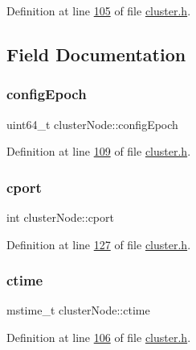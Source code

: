 Definition at line \hyperlink{cluster_8h_source_l00105}{105} of file \hyperlink{cluster_8h_source}{cluster.\+h}.



\subsection{Field Documentation}
\mbox{\label{structclusterNode_aa72bc6455e36e662bc5a53fc427452a5}} 
\subsubsection{\texorpdfstring{config\+Epoch}{configEpoch}}
{\footnotesize\ttfamily uint64\+\_\+t cluster\+Node\+::config\+Epoch}



Definition at line \hyperlink{cluster_8h_source_l00109}{109} of file \hyperlink{cluster_8h_source}{cluster.\+h}.

\mbox{\label{structclusterNode_afd795cbf257e028b15baa5338ebf10e8}} 
\subsubsection{\texorpdfstring{cport}{cport}}
{\footnotesize\ttfamily int cluster\+Node\+::cport}



Definition at line \hyperlink{cluster_8h_source_l00127}{127} of file \hyperlink{cluster_8h_source}{cluster.\+h}.

\mbox{\label{structclusterNode_aa33a6402dfdda11c2b84272b262ee945}} 
\subsubsection{\texorpdfstring{ctime}{ctime}}
{\footnotesize\ttfamily mstime\+\_\+t cluster\+Node\+::ctime}



Definition at line \hyperlink{cluster_8h_source_l00106}{106} of file \hyperlink{cluster_8h_source}{cluster.\+h}.


